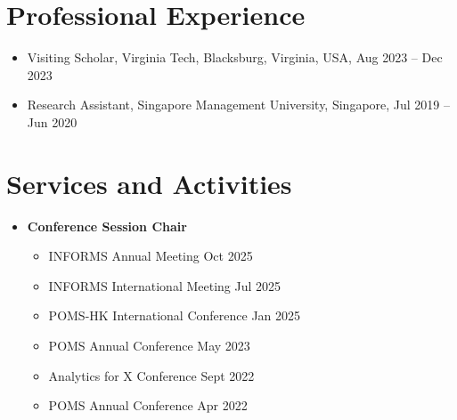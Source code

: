 \documentclass[12pt, a4paper]{article}
\begin{document}
{\begin{itemize}
\end{itemize}




\section*{Professional Experience}

\begin{itemize}[leftmargin=30pt]
    \item Visiting Scholar, Virginia Tech, Blacksburg, Virginia, USA, Aug 2023 -- Dec 2023	
    \item Research Assistant, Singapore Management University, Singapore, Jul 2019 -- Jun 2020
\end{itemize}




\section*{Services and Activities}

\begin{itemize}

	\item[] \textbf{Conference Session Chair}
	\begin{itemize}
		\item INFORMS Annual Meeting \hfill Oct 2025
		\item INFORMS International Meeting \hfill Jul 2025
		\item POMS-HK International Conference \hfill Jan 2025
		\item POMS Annual Conference \hfill May 2023
		\item Analytics for X Conference \hfill Sept 2022
		\item POMS Annual Conference \hfill Apr 2022
	\end{itemize}


\end{itemize}}
\end{document}
